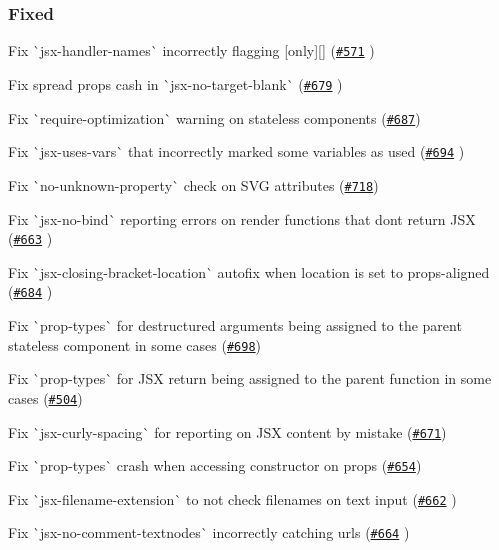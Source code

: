 \subsubsection*{Fixed}


\begin{DoxyItemize}
\item Fix \`{}jsx-\/handler-\/names\`{} incorrectly flagging \mbox{[}{\ttfamily only}\mbox{]}\mbox{[}\mbox{]} (\href{https://github.com/yannickcr/eslint-plugin-react/issues/571}{\tt \#571} )
\item Fix spread props cash in \`{}jsx-\/no-\/target-\/blank\`{} (\href{https://github.com/yannickcr/eslint-plugin-react/pull/679}{\tt \#679} )
\item Fix \`{}require-\/optimization\`{} warning on stateless components (\href{https://github.com/yannickcr/eslint-plugin-react/issues/687}{\tt \#687})
\item Fix \`{}jsx-\/uses-\/vars\`{} that incorrectly marked some variables as used (\href{https://github.com/yannickcr/eslint-plugin-react/issues/694}{\tt \#694} )
\item Fix \`{}no-\/unknown-\/property\`{} check on S\+VG attributes (\href{https://github.com/yannickcr/eslint-plugin-react/issues/718}{\tt \#718})
\item Fix \`{}jsx-\/no-\/bind\`{} reporting errors on render functions that don\textquotesingle{}t return J\+SX (\href{https://github.com/yannickcr/eslint-plugin-react/issues/663}{\tt \#663} )
\item Fix \`{}jsx-\/closing-\/bracket-\/location\`{} autofix when {\ttfamily location} is set to {\ttfamily props-\/aligned} (\href{https://github.com/yannickcr/eslint-plugin-react/pull/684}{\tt \#684} )
\item Fix \`{}prop-\/types\`{} for destructured arguments being assigned to the parent stateless component in some cases (\href{https://github.com/yannickcr/eslint-plugin-react/issues/698}{\tt \#698})
\item Fix \`{}prop-\/types\`{} for J\+SX return being assigned to the parent function in some cases (\href{https://github.com/yannickcr/eslint-plugin-react/issues/504}{\tt \#504})
\item Fix \`{}jsx-\/curly-\/spacing\`{} for reporting on J\+SX content by mistake (\href{https://github.com/yannickcr/eslint-plugin-react/issues/671}{\tt \#671})
\item Fix \`{}prop-\/types\`{} crash when accessing constructor on props (\href{https://github.com/yannickcr/eslint-plugin-react/issues/654}{\tt \#654})
\item Fix \`{}jsx-\/filename-\/extension\`{} to not check filenames on text input (\href{https://github.com/yannickcr/eslint-plugin-react/issues/662}{\tt \#662} )
\item Fix \`{}jsx-\/no-\/comment-\/textnodes\`{} incorrectly catching urls (\href{https://github.com/yannickcr/eslint-plugin-react/issues/664}{\tt \#664} )
\end{DoxyItemize}

